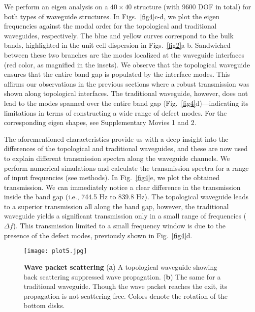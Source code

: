 \documentclass[aps,preprint,onecolumn,showpacs,superscriptaddress,groupedaddress]{revtex4}  %
\begin{document}
We perform an eigen analysis on a $40\times40$ structure (with 9600 DOF in total) for both types of waveguide structures. In Figs.~\ref{fig4}c-d, we plot the eigen frequencies against the modal order for the topological and traditional waveguides, respectively.  The blue and yellow curves correspond to the bulk bands, highlighted in the unit cell dispersion in Figs.~\ref{fig2}a-b. Sandwiched between these two branches are the modes localized at the waveguide interfaces (red color, as magnified in the insets). We observe that the topological waveguide ensures that the entire band gap is populated by the interface modes. This affirms our observations in the previous sections where a robust transmission was shown along topological interfaces. The traditional waveguide, however, does not lead to the modes spanned over the entire band gap (Fig.~\ref{fig4}d)---indicating its limitations in terms of constructing a wide range of defect modes. For the corresponding eigen shapes, see Supplementary Movies 1 and 2.

The aforementioned characteristics provide us with a deep insight into the differences of the topological and traditional waveguides, and these are now used to explain different transmission spectra along the waveguide channels. We perform numerical simulations and calculate the transmission spectra for a range of input frequencies (see methods). In Fig.~\ref{fig4}e, we plot the obtained transmission. We can immediately notice a clear difference in the transmission inside the band gap (i.e., 744.5 Hz to 839.8 Hz). The topological waveguide leads to a superior transmission all along the band gap, however, the traditional waveguide yields a significant transmission only in a small range of frequencies ($\Delta f$). This transmission limited to a small frequency window is due to the presence of the defect modes, previously shown in Fig.~\ref{fig4}d. 
\begin{figure}[!]
\centering
\texttt{[image: plot5.jpg]}
\caption{\textbf{Wave packet scattering} (\textbf{a}) A topological waveguide showing back scattering suppressed wave propagation. (\textbf{b}) The same for a traditional waveguide. Though the wave packet reaches the exit, its propagation is not scattering free. Colors denote the rotation of the bottom disks.}
\label{fig5}
\end{figure} 
\end{document}
